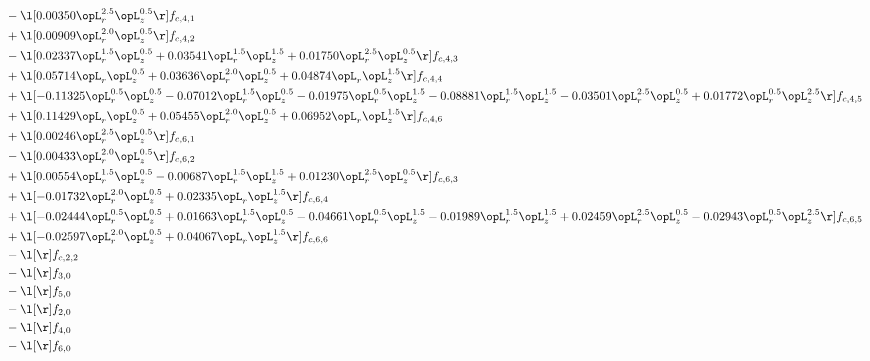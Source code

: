 \begin{alignat}{2}
& - \l[  0.00350 \opL_r^{2.5} \opL_z^{0.5}  \r] f_{c,4,1} \nonumber \\ 
& + \l[  0.00909 \opL_r^{2.0} \opL_z^{0.5}  \r] f_{c,4,2} \nonumber \\ 
& - \l[  0.02337 \opL_r^{1.5} \opL_z^{0.5} +  0.03541 \opL_r^{1.5} \opL_z^{1.5} +  0.01750 \opL_r^{2.5} \opL_z^{0.5}  \r] f_{c,4,3} \nonumber \\ 
& + \l[  0.05714 \opL_r \opL_z^{0.5} +  0.03636 \opL_r^{2.0} \opL_z^{0.5} +  0.04874 \opL_r \opL_z^{1.5}  \r] f_{c,4,4} \nonumber \\ 
& + \l[  -0.11325 \opL_r^{0.5} \opL_z^{0.5}   -0.07012 \opL_r^{1.5} \opL_z^{0.5}   -0.01975 \opL_r^{0.5} \opL_z^{1.5}   -0.08881 \opL_r^{1.5} \opL_z^{1.5}   -0.03501 \opL_r^{2.5} \opL_z^{0.5} +  0.01772 \opL_r^{0.5} \opL_z^{2.5}  \r] f_{c,4,5} \nonumber \\ 
& + \l[  0.11429 \opL_r \opL_z^{0.5} +  0.05455 \opL_r^{2.0} \opL_z^{0.5} +  0.06952 \opL_r \opL_z^{1.5}  \r] f_{c,4,6} \nonumber \\ 
& + \l[  0.00246 \opL_r^{2.5} \opL_z^{0.5}  \r] f_{c,6,1} \nonumber \\ 
& - \l[  0.00433 \opL_r^{2.0} \opL_z^{0.5}  \r] f_{c,6,2} \nonumber \\ 
& + \l[  0.00554 \opL_r^{1.5} \opL_z^{0.5}   -0.00687 \opL_r^{1.5} \opL_z^{1.5} +  0.01230 \opL_r^{2.5} \opL_z^{0.5}  \r] f_{c,6,3} \nonumber \\ 
& + \l[  -0.01732 \opL_r^{2.0} \opL_z^{0.5} +  0.02335 \opL_r \opL_z^{1.5}  \r] f_{c,6,4} \nonumber \\ 
& + \l[  -0.02444 \opL_r^{0.5} \opL_z^{0.5} +  0.01663 \opL_r^{1.5} \opL_z^{0.5}   -0.04661 \opL_r^{0.5} \opL_z^{1.5}   -0.01989 \opL_r^{1.5} \opL_z^{1.5} +  0.02459 \opL_r^{2.5} \opL_z^{0.5}   -0.02943 \opL_r^{0.5} \opL_z^{2.5}  \r] f_{c,6,5} \nonumber \\ 
& + \l[  -0.02597 \opL_r^{2.0} \opL_z^{0.5} +  0.04067 \opL_r \opL_z^{1.5}  \r] f_{c,6,6} \nonumber \\ 
& - \l[  \r] f_{c,2,2} \nonumber \\ 
& - \l[  \r] f_{3,0} \nonumber \\ 
& - \l[  \r] f_{5,0} \nonumber \\ 
& - \l[  \r] f_{2,0} \nonumber \\ 
& - \l[  \r] f_{4,0} \nonumber \\ 
& - \l[  \r] f_{6,0} \nonumber \\ 
\end{alignat} 


